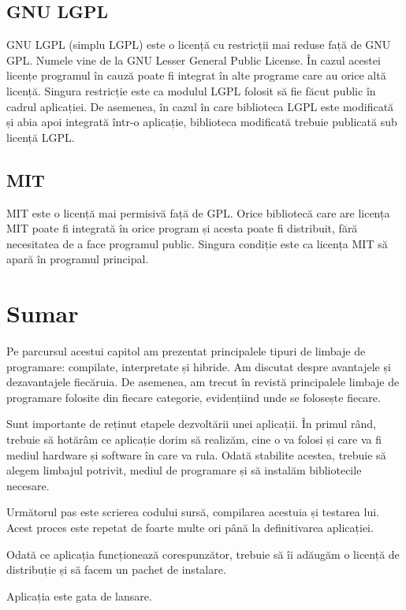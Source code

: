 \subsection{GNU LGPL}
\label{sec:appdev-licensing-lgpl}

GNU LGPL  (simplu LGPL) este
o licență cu restricții mai reduse față de GNU GPL. Numele vine de la GNU
Lesser General Public License. În cazul acestei licențe programul în cauză poate
fi integrat în alte programe care au orice altă licență. Singura restricție este
ca modulul LGPL folosit să fie făcut public în cadrul aplicației. De asemenea,
în cazul în care biblioteca LGPL este modificată și abia apoi integrată într-o
aplicație, biblioteca modificată trebuie publicată sub licență LGPL.

\subsection{MIT}
\label{sec:appdev-licensing-mit}

MIT  este o licență mai
permisivă față de GPL. Orice bibliotecă care are licența MIT poate fi integrată
în orice program și acesta poate fi distribuit, fără necesitatea de a face
programul public. Singura condiție este ca licența MIT să apară în programul
principal.

\section{Sumar}
\label{sec:appdev-summary}

Pe parcursul acestui capitol am prezentat principalele tipuri de limbaje de
programare: compilate, interpretate și hibride. Am discutat despre avantajele și
dezavantajele fiecăruia. De asemenea, am trecut în revistă principalele limbaje
de programare folosite din fiecare categorie, evidențiind unde se folosește
fiecare.

Sunt importante de reținut etapele dezvoltării unei aplicații. În primul rând,
trebuie să hotărâm ce aplicație dorim să realizăm, cine o va folosi și care va
fi mediul hardware și software în care va rula. Odată stabilite acestea, trebuie
să alegem limbajul potrivit, mediul de programare și să instalăm bibliotecile
necesare.

Următorul pas este scrierea codului sursă, compilarea acestuia și testarea lui.
Acest proces este repetat de foarte multe ori până la definitivarea aplicației.

Odată ce aplicația funcționează corespunzător, trebuie să îi adăugăm o licență
de distribuție și să facem un pachet de instalare.

Aplicația este gata de lansare.
